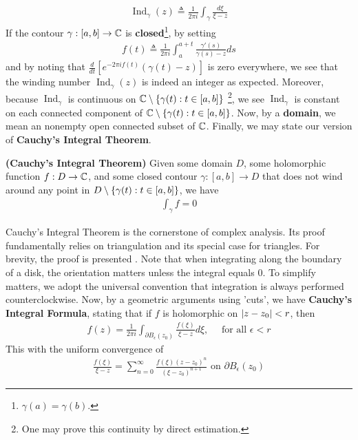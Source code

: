 \documentclass{report}
\begin{document}
\begin{align*}
\operatorname{Ind}_\gamma (z)\triangleq  \frac{1}{2\pi i}\int_\gamma \frac{d\xi}{\xi -z}
\end{align*}
If the contour $\gamma :[a,b]\rightarrow \mathbb{C}$ is \textbf{closed}\footnote{$\gamma  (a)=\gamma (b)$.}, by setting 
\begin{align*}
f(t)\triangleq  \frac{1}{2\pi i}\int_a^{a+t} \frac{\gamma '(s)}{\gamma (s)-z}ds
\end{align*}
and by noting that  $\frac{d}{dt}[e^{-2\pi  if(t)}(\gamma (t)-z)]$ is zero everywhere, we see that the winding number $\operatorname{Ind}_\gamma (z)$ is indeed an integer as expected. Moreover, because $\operatorname{Ind}_\gamma $ is continuous on $\mathbb{C} \setminus \{ \gamma (t):t \in [a,b] \}$ \footnote{One may prove this continuity by direct estimation.}, we see $\operatorname{Ind}_\gamma $ is constant on each connected component of $\mathbb{C} \setminus \{ \gamma (t):t \in [a,b] \}$. Now, by a \textbf{domain}, we mean an nonempty open connected subset of $\mathbb{C}$. Finally, we may state our version of \textbf{Cauchy's Integral Theorem}.  
\begin{theorem}
\textbf{(Cauchy's Integral Theorem)} Given some domain $D$, some holomorphic function $f:D\rightarrow \mathbb{C}$, and some closed contour $\gamma :[a,b]\rightarrow D$ that does not wind around any point in $D \setminus \{ \gamma (t):t \in [a,b] \}$, we have 
\begin{align*}
\int_\gamma f=0
\end{align*}
\end{theorem}
Cauchy's Integral Theorem is the cornerstone of complex analysis. Its proof fundamentally relies on triangulation and its special case for triangles. For brevity, the proof is presented . Note that when integrating along the boundary of a disk, the orientation matters unless the integral equals $0$. To simplify matters, we adopt the universal convention that integration is always performed counterclockwise. Now, by a geometric arguments using 'cuts', we have \textbf{Cauchy's Integral Formula}, stating that if $f$ is holomorphic on  $\left|z-z_0\right|<r$, then  
\begin{align*}
f(z)= \frac{1}{2\pi  i}\int_{\partial B_\epsilon (z_0) }\frac{f(\xi)}{\xi - z}d\xi,\quad\text{ for all }\epsilon <r
\end{align*}
This with the uniform convergence of 
\begin{align*}
\frac{f(\xi)}{\xi -z} = \sum_{n=0}^{\infty} \frac{f(\xi) (z-z_0)^n }{(\xi -z_0)^{n+1}}\text{ on }\partial B_\epsilon (z_0)
\end{align*}
\end{document}
